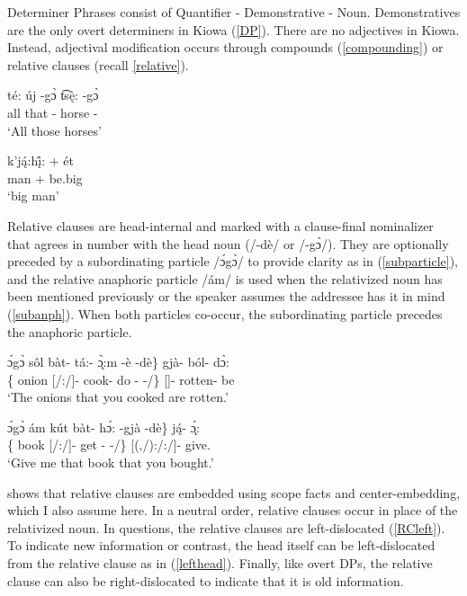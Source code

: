 \documentclass[output=paper]{langscibook}
\begin{document}
Determiner Phrases consist of Quantifier - Demonstrative - Noun. Demonstratives are the only overt determiners in Kiowa (\ref{DP}). There are no adjectives in Kiowa. Instead, adjectival modification occurs through compounds (\ref{compounding}) or relative clauses (recall \ref{relative}). 

\ea \label{DP}
\gll té: új -g\`{ɔ} t͡s\k{ê}: -g\`{ɔ}\\
all that -{\Inv} horse -{\Inv}\\
\trans `All those horses' \citep[adapted from][35]{McKenzie:2012}
\z

\ea \label{compounding}
\gll k'j\k{á}:h\k{î}: + ét\\
man + be.big\\
\trans `big man' \citep[][48]{Miller:2018}
\z

Relative clauses are head-internal and marked with a clause-final nominalizer that agrees in number with the head noun (/-dè/ or /-g\`{ɔ}/). They are optionally preceded by a subordinating particle /\'{ɔ}g\`{ɔ}/ to provide clarity as in (\ref{subparticle}), and the relative anaphoric particle /ám/ is used when the relativized noun has been mentioned previously or the speaker assumes the addressee has it in mind (\ref{subanph}). When both particles co-occur, the subordinating particle precedes the anaphoric particle.

\ea \label{subparticle}
\gll {\{}\'{ɔ}g\`{ɔ} sôl b\`at- tá:- {\k{\`ɔ}}:m -è -dè{\}} gj\`a- ból- d\`{ɔ}:\\
{\{}{\Sub} onion [\Second\Sg/\Aarg:\Pl/\Obj]- cook- do -{\Pfv} -{\Nom}/{\Bas}{\}} [\Pl]- rotten- be  \\
\trans `The onions that you cooked are rotten.' \citep[][231]{Watkins:1984}
\z

\ea \label{subanph}
\gll {\{}\'{ɔ}g\`{ɔ} ám kút b\`at- h\'{ɔ}: -gj\`a -dè{\}} j\k{á}- \k{\'ɔ}: \\
{\{}{\Sub} {\Anph} book [\Second\Sg/\Aarg:\Pl/\Obj]- get -{\Pfv} -{\Nom}/{\Bas}{\}} [(\Second,\Third\Sg/\Aarg):\First\Sg/\Parg:\Pl/\Obj]- give.\Ipfv\\
\trans `Give me that book that you bought.' \citep[][231]{Watkins:1984}
\z

\citet{McKenzie:2012} shows that relative clauses are embedded using scope facts and center-embedding, which I also assume here. In a neutral order, relative clauses occur in place of the relativized noun. In questions, the relative clauses are left-dislocated (\ref{RCleft}). To indicate new information or contrast, the head itself can be left-dislocated from the relative clause as in (\ref{lefthead}). Finally, like overt DPs, the relative clause can also be right-dislocated to indicate that it is old information. 
\end{document}
